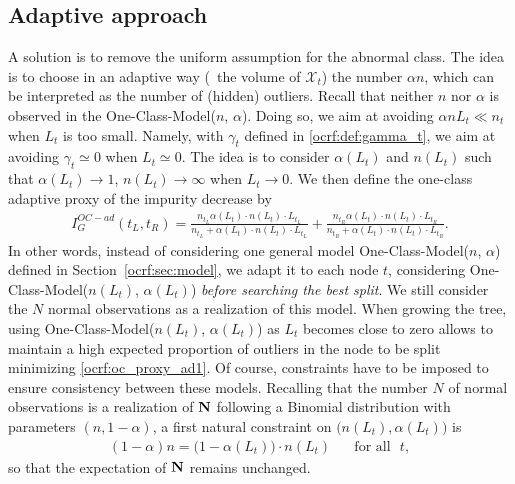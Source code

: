 
\subsection{Adaptive approach}

A solution is to remove the uniform assumption for the abnormal class.
The idea is to choose in an adaptive way (\wrt~the volume of $\mathcal{X}_t$) the number $\alpha n$, which can be interpreted as the number of (hidden) outliers. Recall that neither $n$ nor $\alpha$ is observed in the One-Class-Model($n$, $\alpha$). Doing so, we aim at avoiding $\alpha n L_t \ll n_t$ when $L_t$ is too small. Namely, with $\gamma_t$ defined in \eqref{ocrf:def:gamma_t}, we aim at avoiding $\gamma_t \simeq 0$ when $L_t \simeq 0$. The idea is to consider $\alpha(L_t)$ and $n(L_t)$ such that $\alpha(L_t) \to 1$, $n(L_t) \to \infty$ when $L_t \to 0$.
We then define the one-class adaptive proxy of the impurity decrease by
\begin{align}
\label{ocrf:oc_proxy_ad1}
I_G^{OC-ad}(t_L, t_R)= \frac{n_{t_L}\alpha(L_t) \cdot n(L_t) \cdot L_{t_L}}{n_{t_L} + \alpha(L_t) \cdot n(L_t) \cdot L_{t_L}} + \frac{n_{t_R}\alpha(L_t) \cdot n(L_t) \cdot L_{t_R}}{n_{t_R} + \alpha(L_t) \cdot n(L_t) \cdot L_{t_R}}.
\end{align}
In other words, instead of considering one general model One-Class-Model($n$, $\alpha$) defined in Section~\ref{ocrf:sec:model}, we adapt it to each node $t$, considering One-Class-Model($n(L_t)$, $\alpha(L_t)$) \emph{before searching the best split}. We still consider the $N$ normal observations as a realization of this model. When growing the tree, using One-Class-Model($n(L_t)$, $\alpha(L_t)$) as $L_t$ becomes close to zero allows to maintain a high expected proportion of outliers in the node to be split minimizing \eqref{ocrf:oc_proxy_ad1}.
Of course, constraints have to be imposed to ensure consistency between these models.
%
Recalling that the number $N$ of normal observations is a realization of $\mathbf N$ following a Binomial distribution with parameters $(n, 1-\alpha)$, a first natural constraint on $\big(n(L_t), \alpha(L_t)\big)$ is
\begin{align}
\label{ocrf:constraint1}
(1-\alpha)n = \big(1-\alpha(L_t)\big) \cdot n(L_t) \text{~~~~~for all~~} t,
\end{align}
so that the expectation of $\mathbf N$ remains unchanged. %
%

